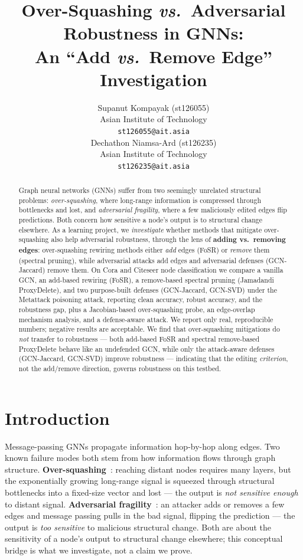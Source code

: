 \documentclass[11pt]{article}
\title{Over-Squashing \textit{vs.}\ Adversarial Robustness in GNNs:\\
An ``Add \textit{vs.}\ Remove Edge'' Investigation}
\author{Supanut Kompayak (st126055) \\
  Asian Institute of Technology \\
  \texttt{st126055@ait.asia} \\\And
  Dechathon Niamsa-Ard (st126235) \\
  Asian Institute of Technology \\
  \texttt{st126235@ait.asia}}
\begin{document}
\maketitle

\begin{abstract}
Graph neural networks (GNNs) suffer from two seemingly unrelated structural problems: \emph{over-squashing},
where long-range information is compressed through bottlenecks and lost, and \emph{adversarial fragility},
where a few maliciously edited edges flip predictions. Both concern how sensitive a node's output is to
structural change elsewhere. As a learning project, we \emph{investigate} whether methods that mitigate
over-squashing also help adversarial robustness, through the lens of \textbf{adding vs.\ removing edges}:
over-squashing rewiring methods either \emph{add} edges (FoSR) or \emph{remove} them (spectral pruning),
while adversarial attacks add edges and adversarial defenses (GCN-Jaccard) remove them. On Cora and
Citeseer node classification we compare a vanilla GCN, an add-based rewiring (FoSR), a remove-based
spectral pruning (Jamadandi ProxyDelete), and two purpose-built defenses (GCN-Jaccard, GCN-SVD) under the
Metattack poisoning attack, reporting clean accuracy, robust accuracy, and the robustness gap, plus a
Jacobian-based over-squashing probe, an edge-overlap mechanism analysis, and a defense-aware attack. We
report only real, reproducible numbers; negative results are acceptable. We find that over-squashing
mitigations do \emph{not} transfer to robustness --- both add-based FoSR and spectral remove-based
ProxyDelete behave like an undefended GCN, while only the attack-aware defenses (GCN-Jaccard, GCN-SVD)
improve robustness --- indicating that the editing \emph{criterion}, not the add/remove direction,
governs robustness on this testbed.

\end{abstract}

\section{Introduction}
Message-passing GNNs propagate information hop-by-hop along edges. Two known failure modes both stem from
how information flows through graph structure. \textbf{Over-squashing}~\citep{alon2021bottleneck,
topping2022understanding,digiovanni2023oversquashing}: reaching distant nodes requires many layers, but the
exponentially growing long-range signal is squeezed through structural bottlenecks into a fixed-size vector
and lost --- the output is \emph{not sensitive enough} to distant signal. \textbf{Adversarial
fragility}~\citep{zugner2019metattack,zugner2018nettack}: an attacker adds or removes a few edges and message
passing pulls in the bad signal, flipping the prediction --- the output is \emph{too sensitive} to malicious
structural change. Both are about the sensitivity of a node's output to structural change elsewhere; this
conceptual bridge is what we investigate, not a claim we prove.
\end{document}
